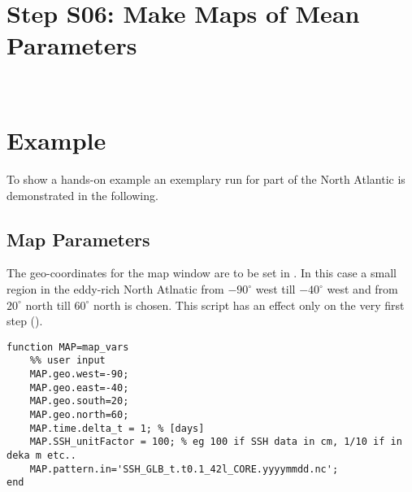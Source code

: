 \section{Step S06: Make Maps of Mean Parameters}
\\
 

\section{Example}
To show a hands-on example an exemplary run for part of the North Atlantic is
demonstrated in the following. 
\subsection{Map Parameters} \label{codeEx:map_params}
The geo-coordinates for the map window are to be set in .
In this case a small region in the eddy-rich North Atlnatic from $-90^\circ$
west till $-40^\circ$ west and from $20^\circ$ north till $60^\circ$ north is
chosen. This script has an effect only on the very first step ().
\begin{lstlisting}
function MAP=map_vars
	%% user input
	MAP.geo.west=-90;
	MAP.geo.east=-40;
	MAP.geo.south=20;
	MAP.geo.north=60;
	MAP.time.delta_t = 1; % [days]
	MAP.SSH_unitFactor = 100; % eg 100 if SSH data in cm, 1/10 if in deka m etc..
	MAP.pattern.in='SSH_GLB_t.t0.1_42l_CORE.yyyymmdd.nc';
end
\end{lstlisting}
